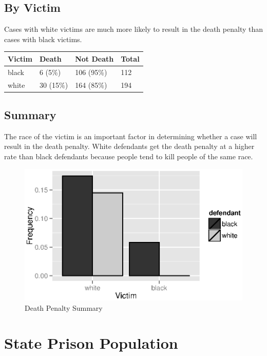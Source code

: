 \documentclass{exam}
\begin{document}
  \subsection{By Victim}

  Cases with white victims are much more likely to result in the death penalty than cases with black victims.
  \begin{table}[H]
    \centering
    \begin{tabular}{llll}
      \toprule
      Victim & Death     & Not Death  & Total \\
      \midrule
      black  & 6 (5\%)   & 106 (95\%) & 112 \\
      white  & 30 (15\%) & 164 (85\%) & 194 \\
      \bottomrule
    \end{tabular}
  \end{table}

  \subsection{Summary}
  The race of the victim is an important factor in determining whether a case will result in the death penalty.  White
  defendants get the death penalty at a higher rate than black defendants because people tend to kill people of the same
  race.

  \begin{figure}[H]
    \centering
    \includegraphics[scale = 0.9]{death_penalty.eps}
    \caption{Death Penalty Summary}
  \end{figure}

  \section{State Prison Population}
\end{document}

